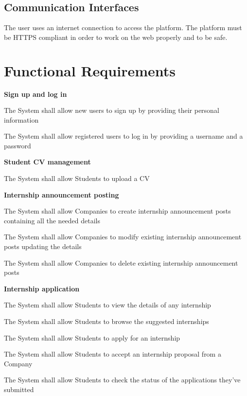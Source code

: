 \subsection{Communication Interfaces }
The user uses an internet connection to access the platform. The platform must be HTTPS compliant in order to work on the web properly and to be safe.

\section{Functional Requirements }
\textbf{Sign up and log in}
\begin{enumerate}[label={[R\arabic{enumi}]}]
    \item The System shall allow new users to sign up by providing their personal information
    \item The System shall allow registered users to log in by providing a username and a password
\end{enumerate}
\textbf{Student CV management}
\begin{enumerate}[label={[R\arabic{enumi}]}]
    \setcounter{enumi}{2}
    \item The System shall allow Students to upload a CV
\end{enumerate}
\textbf{Internship announcement posting}
\begin{enumerate}[label={[R\arabic{enumi}]}]
    \setcounter{enumi}{3}
    \item The System shall allow Companies to create internship announcement posts containing all the needed details
    \item The System shall allow Companies to modify existing internship announcement posts updating the details
    \item The System shall allow Companies to delete existing internship announcement posts
\end{enumerate}
\textbf{Internship application}
\begin{enumerate}[label={[R\arabic{enumi}]}]
    \setcounter{enumi}{6}
    \item The System shall allow Students to view the details of any internship
    \item The System shall allow Students to browse the suggested internships
    \item The System shall allow Students to apply for an internship
    \item The System shall allow Students to accept an internship proposal from a Company
    \item The System shall allow Students to check the status of the applications they've submitted
\end{enumerate}
